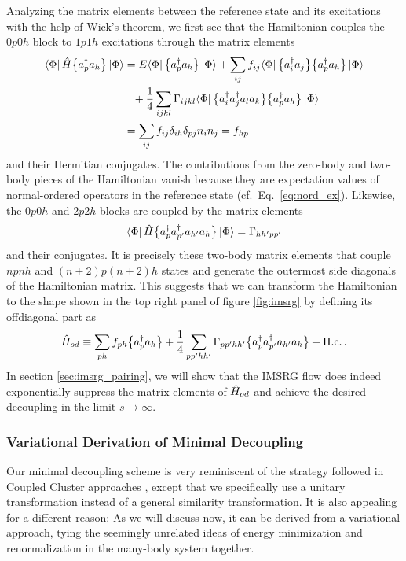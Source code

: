 Analyzing the matrix elements between the reference state and its
excitations with the help of Wick's theorem, we first see that the 
Hamiltonian couples the $0p0h$ block to $1p1h$ excitations through 
the matrix elements
\begin{align}
\matrixe{\Phi}{\HO\nord{\aaO_{p}\aO_{h}}}{\Phi}
  &=E\matrixe{\Phi}{\nord{\aaO_{p}\aO_{h}}}{\Phi}
    +\sum_{ij}f_{ij}\matrixe{\Phi}{\nord{\aaO_{i}\aO_{j}}\nord{\aaO_{p}\aO_{h}}}{\Phi}\notag\\
  &\hphantom{=}+\frac{1}{4}\sum_{ijkl}\Gamma_{ijkl}
      \matrixe{\Phi}{\nord{\aaO_{i}\aaO_{j}\aO_{l}\aO_{k}}\nord{\aaO_{p}\aO_{h}}}{\Phi}\notag\\
  &=\sum_{ij}f_{ij}\delta_{ih}\delta_{pj}n_i\nn_j = f_{hp} \label{eq:coupl_1p1h}
\end{align}
and their Hermitian conjugates. The contributions from the zero-body and 
two-body pieces of the Hamiltonian vanish because they are expectation
values of normal-ordered operators in the reference state (cf.~Eq.~\eqref{eq:nord_ex}).
Likewise, the $0p0h$ and $2p2h$ blocks are coupled by the matrix elements
\begin{equation}
\langle{\Phi}|\,{\hat{H}\big\{a^\dag_{p}a^\dag_{p'}a_{h'}a_{h}\big\}}\,|{\Phi}\rangle = \Gamma_{hh'pp'}
\end{equation}
and their conjugates. It is precisely these two-body matrix elements 
that couple $npnh$ and $(n\pm2)p(n\pm2)h$ states and generate the
outermost side diagonals of the Hamiltonian matrix. This suggests that 
we can transform the Hamiltonian to the shape shown in the top right panel
of figure \ref{fig:imsrg} by defining its offdiagonal part as
\begin{equation}
  \hat{H}_{od} \equiv \sum_{ph}f_{ph}\big\{a^\dag_{p}a_{h}\big\} + 
              \frac{1}{4}\sum_{pp'hh'}\Gamma_{pp'hh'}\big\{a^\dag_{p}a^\dag_{p'}a_{h'}a_{h}\big\} + \text{H.c.}\,.
\end{equation}
In section \ref{sec:imsrg_pairing}, we will show that the IMSRG flow does indeed
exponentially suppress the matrix elements of $\hat{H}_{od}$ and 
achieve the desired decoupling in the limit $s\to\infty$. 

%
%
\subsubsection{\label{sec:imsrg_variational}Variational Derivation of Minimal Decoupling}
Our minimal decoupling scheme is very reminiscent of the strategy 
followed in Coupled Cluster approaches \cite{Shavitt:2009,Hagen:2014ve}, except 
that we specifically use a unitary transformation instead of a general 
similarity transformation. It is also appealing for a different reason: As 
we will discuss now, it can be derived from a variational approach, tying
the seemingly unrelated ideas of energy minimization and renormalization 
in the many-body system together. 

